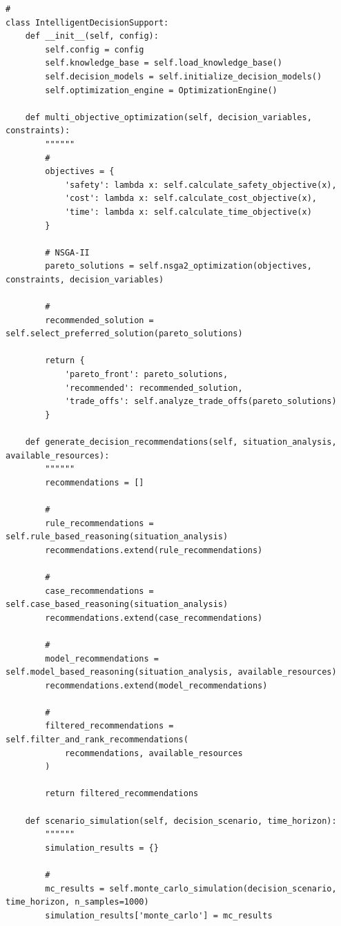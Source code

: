 \begin{verbatim}
#   
class IntelligentDecisionSupport:
    def __init__(self, config):
        self.config = config
        self.knowledge_base = self.load_knowledge_base()
        self.decision_models = self.initialize_decision_models()
        self.optimization_engine = OptimizationEngine()
        
    def multi_objective_optimization(self, decision_variables, constraints):
        """"""
        # 
        objectives = {
            'safety': lambda x: self.calculate_safety_objective(x),
            'cost': lambda x: self.calculate_cost_objective(x),  
            'time': lambda x: self.calculate_time_objective(x)
        }
        
        # NSGA-II
        pareto_solutions = self.nsga2_optimization(objectives, constraints, decision_variables)
        
        # 
        recommended_solution = self.select_preferred_solution(pareto_solutions)
        
        return {
            'pareto_front': pareto_solutions,
            'recommended': recommended_solution,
            'trade_offs': self.analyze_trade_offs(pareto_solutions)
        }
    
    def generate_decision_recommendations(self, situation_analysis, available_resources):
        """"""
        recommendations = []
        
        # 
        rule_recommendations = self.rule_based_reasoning(situation_analysis)
        recommendations.extend(rule_recommendations)
        
        # 
        case_recommendations = self.case_based_reasoning(situation_analysis)
        recommendations.extend(case_recommendations)
        
        #   
        model_recommendations = self.model_based_reasoning(situation_analysis, available_resources)
        recommendations.extend(model_recommendations)
        
        # 
        filtered_recommendations = self.filter_and_rank_recommendations(
            recommendations, available_resources
        )
        
        return filtered_recommendations
    
    def scenario_simulation(self, decision_scenario, time_horizon):
        """"""
        simulation_results = {}
        
        # 
        mc_results = self.monte_carlo_simulation(decision_scenario, time_horizon, n_samples=1000)
        simulation_results['monte_carlo'] = mc_results
        

\end{verbatim}
